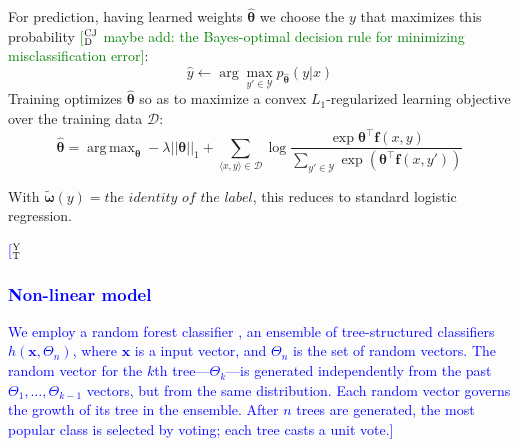 \documentclass[11pt,letterpaper]{article}
\DeclareMathOperator*{\argmax}{arg\,max}
\newcommand{\ensuretext}[1]{#1}
\newcommand{\cjdmarker}{\ensuretext{\textcolor{green}{\ensuremath{^{\textsc{CJ}}_{\textsc{D}}}}}}
\newcommand{\nssmarker}{\ensuretext{\textcolor{magenta}{\ensuremath{^{\textsc{NS}}_{\textsc{S}}}}}}
\newcommand{\ytmarker}{\ensuretext{\textcolor{blue}{\ensuremath{^{\textsc{Y}}_{\textsc{T}}}}}}
\newcommand{\arkcomment}[3]{\ensuretext{\textcolor{#3}{[#1 #2]}}}
\newcommand{\cjd}[1]{\arkcomment{\cjdmarker}{#1}{green}}
\newcommand{\nss}[1]{\arkcomment{\nssmarker}{#1}{magenta}}
\newcommand{\yt}[1]{\arkcomment{\ytmarker}{#1}{blue}}
\newcommand{\costversion}[1]{}
\begin{document}
For prediction, having learned weights $\hat{\boldsymbol{\theta}}$ we choose the $y$ that maximizes this probability \cjd{maybe add: the Bayes-optimal decision rule for minimizing misclassification error}:
\begin{equation}
\hat{y} \leftarrow \arg\max_{y' \in \mathcal{Y}} p_{\hat{\boldsymbol{\theta}}}(y | x)
\end{equation}
Training optimizes $\hat{\boldsymbol{\theta}}$ so as to maximize a convex $L_1$-regularized
\costversion{\emph{softmax-margin} }learning objective\costversion{ \citep{gimpel}} over the training data $\mathcal{D}$:
\begin{equation}
\hat{\boldsymbol{\theta}} = \argmax_{\boldsymbol{\theta}} 
-\lambda ||\boldsymbol{\theta}||_1 
+ \sum_{\langle x,y \rangle\in\mathcal{D}} \log{\frac{\exp{\boldsymbol{\theta}^{\top}\mathbf{f}(x,y)}}{\sum_{y' \in \mathcal{Y}}\exp{\left(\boldsymbol{\theta}^{\top}\mathbf{f}(x,y')\costversion{ + \kappa\textit{cost}(y,y')}\right)}}}
\end{equation}
\costversion{The \emph{cost function} allows us to penalize some errors more than others during training, 
taking into account the linguistic functions of the labels.
It is zero for the gold label and nonnegative for the others.\nss{intuition}

This framework gives us several ways to design a classifier appropriate to the task: 
the attributes, the space of labels $\mathcal{Y}$ to consider, 
and the cost function, and of course, the features themselves.}
With \costversion{$\kappa = 0$, $\mathcal{Y} = \{\textit{gold labels in training}\}$, 
and }$\tilde{\boldsymbol{\omega}}(y) = \textit{the identity of the label}$, 
this reduces to standard logistic regression.

\yt{\subsubsection{Non-linear model}
We employ a random forest classifier \citep{Breiman:2001}, an ensemble of tree-structured classifiers ${h(\mathbf{x}, \Theta_n)}$, where $\mathbf{x}$ is a input vector, and ${\Theta_n}$ is the set of random vectors. The random vector for the $k$th tree---$\Theta_k$---is generated independently from the past $\Theta_1, \dots, \Theta_{k-1}$ vectors, but from the same distribution. Each random vector governs the growth of its tree in the ensemble. After $n$ trees are generated, the most popular class is selected by voting; each tree casts a unit vote.}
 
\end{document}
